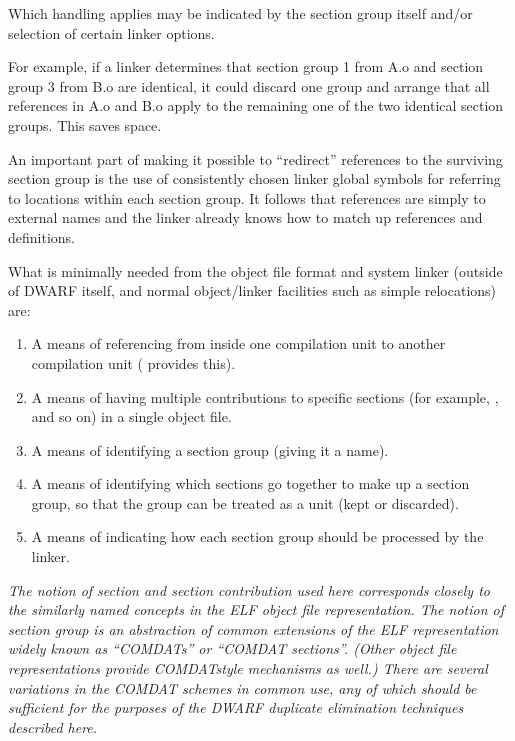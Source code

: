 Which handling applies may be indicated by the section group
itself and/or selection of certain linker options.

For example, if a linker determines that section group 1
from A.o and section group 3 from B.o are identical, it could
discard one group and arrange that all references in A.o and
B.o apply to the remaining one of the two identical section
groups. This saves space.

An important part of making it possible to “redirect”
references to the surviving section group is the use of
consistently chosen linker global symbols for referring to
locations within each section group. It follows that references
are simply to external names and the linker already knows
how to match up references and definitions.

What is minimally needed from the object file format and system
linker (outside of DWARF itself, and normal object/linker
facilities such as simple relocations) are:

\begin{enumerate}[1.]

\item A means of referencing from inside one 
compilation unit to another 
 compilation unit
( provides this).

\item A means of having multiple contributions to specific sections
(for example, , and so on) in a single object file.

\item  A means of identifying a section group (giving it a name).

\item A means of identifying which sections go together to make
up a section group, so that the group can be treated as a unit
(kept or discarded).

\item  A means of indicating how each section group should be
processed by the linker.

\end{enumerate}

\textit{The notion of section and section contribution used here
corresponds closely to the similarly named concepts in the
ELF object file representation. The notion of section group is
an abstraction of common extensions of the ELF representation
widely known as ``COMDATs'' or ``COMDAT sections''. (Other
object file representations provide COMDAT\dash style mechanisms as
well.) There are several variations in the COMDAT schemes in
common use, any of which should be sufficient for the purposes
of the DWARF duplicate elimination techniques described here.}

